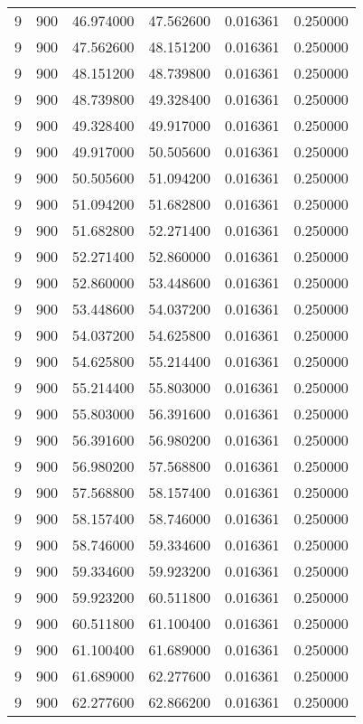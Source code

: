 \begin{longtable}{rrrrrr}
9 & 900 & 46.974000 & 47.562600 & 0.016361 & 0.250000 \\
9 & 900 & 47.562600 & 48.151200 & 0.016361 & 0.250000 \\
9 & 900 & 48.151200 & 48.739800 & 0.016361 & 0.250000 \\
9 & 900 & 48.739800 & 49.328400 & 0.016361 & 0.250000 \\
9 & 900 & 49.328400 & 49.917000 & 0.016361 & 0.250000 \\
9 & 900 & 49.917000 & 50.505600 & 0.016361 & 0.250000 \\
9 & 900 & 50.505600 & 51.094200 & 0.016361 & 0.250000 \\
9 & 900 & 51.094200 & 51.682800 & 0.016361 & 0.250000 \\
9 & 900 & 51.682800 & 52.271400 & 0.016361 & 0.250000 \\
9 & 900 & 52.271400 & 52.860000 & 0.016361 & 0.250000 \\
9 & 900 & 52.860000 & 53.448600 & 0.016361 & 0.250000 \\
9 & 900 & 53.448600 & 54.037200 & 0.016361 & 0.250000 \\
9 & 900 & 54.037200 & 54.625800 & 0.016361 & 0.250000 \\
9 & 900 & 54.625800 & 55.214400 & 0.016361 & 0.250000 \\
9 & 900 & 55.214400 & 55.803000 & 0.016361 & 0.250000 \\
9 & 900 & 55.803000 & 56.391600 & 0.016361 & 0.250000 \\
9 & 900 & 56.391600 & 56.980200 & 0.016361 & 0.250000 \\
9 & 900 & 56.980200 & 57.568800 & 0.016361 & 0.250000 \\
9 & 900 & 57.568800 & 58.157400 & 0.016361 & 0.250000 \\
9 & 900 & 58.157400 & 58.746000 & 0.016361 & 0.250000 \\
9 & 900 & 58.746000 & 59.334600 & 0.016361 & 0.250000 \\
9 & 900 & 59.334600 & 59.923200 & 0.016361 & 0.250000 \\
9 & 900 & 59.923200 & 60.511800 & 0.016361 & 0.250000 \\
9 & 900 & 60.511800 & 61.100400 & 0.016361 & 0.250000 \\
9 & 900 & 61.100400 & 61.689000 & 0.016361 & 0.250000 \\
9 & 900 & 61.689000 & 62.277600 & 0.016361 & 0.250000 \\
9 & 900 & 62.277600 & 62.866200 & 0.016361 & 0.250000 \\

\end{longtable}

